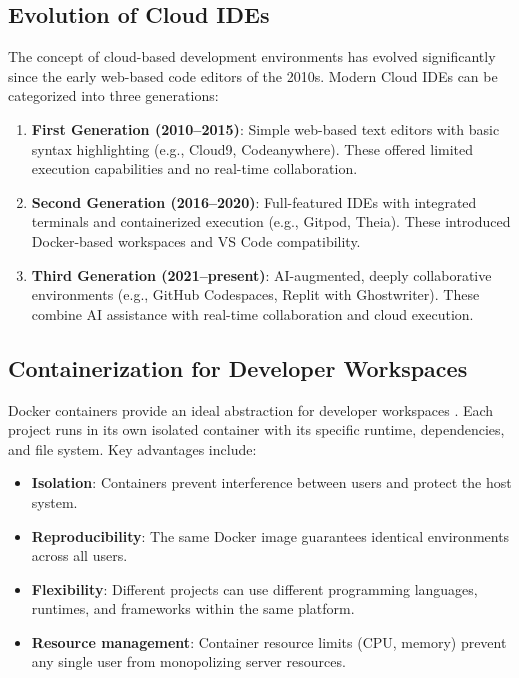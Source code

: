 \documentclass[12pt,a4paper,oneside]{report}
\begin{document}
\subsection{Evolution of Cloud IDEs}

The concept of cloud-based development environments has evolved significantly since the early web-based code editors of the 2010s. Modern Cloud IDEs can be categorized into three generations:

\begin{enumerate}[label=\arabic*.]
    \item \textbf{First Generation (2010--2015)}: Simple web-based text editors with basic syntax highlighting (e.g., Cloud9, Codeanywhere). These offered limited execution capabilities and no real-time collaboration.
    \item \textbf{Second Generation (2016--2020)}: Full-featured IDEs with integrated terminals and containerized execution (e.g., Gitpod, Theia). These introduced Docker-based workspaces and VS Code compatibility.
    \item \textbf{Third Generation (2021--present)}: AI-augmented, deeply collaborative environments (e.g., GitHub Codespaces, Replit with Ghostwriter). These combine AI assistance with real-time collaboration and cloud execution.
\end{enumerate}

\subsection{Containerization for Developer Workspaces}

Docker containers provide an ideal abstraction for developer workspaces \cite{sun2022, kaur2021}. Each project runs in its own isolated container with its specific runtime, dependencies, and file system. Key advantages include:

\begin{itemize}
    \item \textbf{Isolation}: Containers prevent interference between users and protect the host system.
    \item \textbf{Reproducibility}: The same Docker image guarantees identical environments across all users.
    \item \textbf{Flexibility}: Different projects can use different programming languages, runtimes, and frameworks within the same platform.
    \item \textbf{Resource management}: Container resource limits (CPU, memory) prevent any single user from monopolizing server resources.
\end{itemize}
\end{document}
